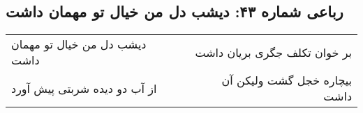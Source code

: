 \begin{center}
\section*{رباعی شماره ۴۳: دیشب دل من خیال تو مهمان داشت}
\label{sec:043}
\begin{longtable}{l p{0.5cm} r}
دیشب دل من خیال تو مهمان داشت
&&
بر خوان تکلف جگری بریان داشت
\\
از آب دو دیده شربتی پیش آورد
&&
بیچاره خجل گشت ولیکن آن داشت
\\
\end{longtable}
\end{center}
